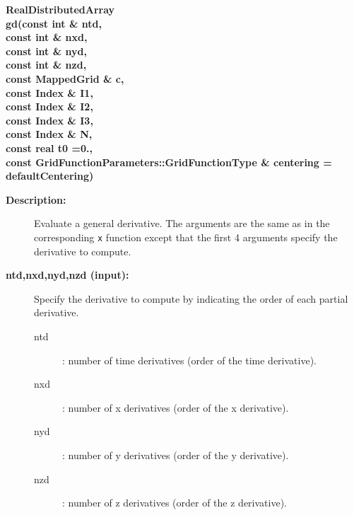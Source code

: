  
\begin{flushleft} \textbf{%
RealDistributedArray  \\ 
\settowidth{\OGFunctionIncludeArgIndent}{gd(}%
gd(const int \& ntd, \\ 
\hspace{\OGFunctionIncludeArgIndent}const int \& nxd, \\ 
\hspace{\OGFunctionIncludeArgIndent}const int \& nyd, \\ 
\hspace{\OGFunctionIncludeArgIndent}const int \& nzd,\\ 
\hspace{\OGFunctionIncludeArgIndent}const MappedGrid \& c, \\ 
\hspace{\OGFunctionIncludeArgIndent}const Index \& I1,\\ 
\hspace{\OGFunctionIncludeArgIndent}const Index \& I2,\\ 
\hspace{\OGFunctionIncludeArgIndent}const Index \& I3, \\ 
\hspace{\OGFunctionIncludeArgIndent}const Index \& N, \\ 
\hspace{\OGFunctionIncludeArgIndent}const real t0  =0.,\\ 
\hspace{\OGFunctionIncludeArgIndent}const GridFunctionParameters::GridFunctionType \& centering  = defaultCentering)
}\end{flushleft}
\begin{description}
\item[{\bf Description:}]  Evaluate a general derivative. The arguments are the same as in the
 corresponding {\tt x} function except that the first 4 arguments specify the derivative
 to compute.
\item[{\bf ntd,nxd,nyd,nzd (input):}]  Specify the derivative to compute by indicating the order
   of each partial derivative. 
    \begin{description}
       \item[ntd] : number of time derivatives (order of the time derivative).
       \item[nxd] : number of x derivatives (order of the x derivative).
       \item[nyd] : number of y derivatives (order of the y derivative).
       \item[nzd] : number of z derivatives (order of the z derivative).
    \end{description}
\end{description}
